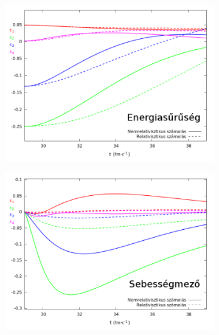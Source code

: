 \documentclass{beamer}
\begin{document}
\begin{frame}
\begin{center}
\begin{itemize}
\end{itemize}
\begin{figure}[H]
	\centering
    \begin{subfigure}[b]{0.49\textwidth}
    		\includegraphics[width=\textwidth]{pic/res/relnonrel_e}
	\end{subfigure}
	\begin{subfigure}[b]{0.49\textwidth}
        	\includegraphics[width=\textwidth]{pic/res/relnonrel_v}
	\end{subfigure}
\end{figure}
\end{center}
\end{frame}
\end{document}
